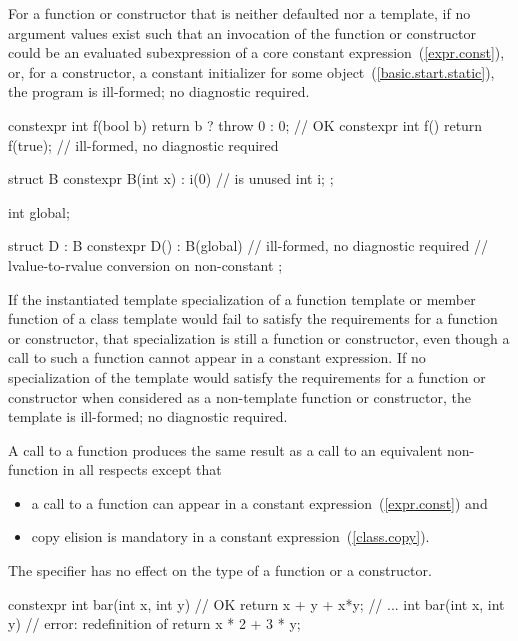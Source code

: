 \pnum
For a  function or  constructor
that is neither defaulted nor a template,
if no argument values exist such that
an invocation of the function or constructor could be an evaluated subexpression of a core
constant expression~(\ref{expr.const}), or,
for a constructor, a constant initializer for some object~(\ref{basic.start.static}),
the program is ill-formed; no diagnostic required.
\begin{example}
\begin{codeblock}
constexpr int f(bool b)
  { return b ? throw 0 : 0; }               // OK
constexpr int f() { return f(true); }       // ill-formed, no diagnostic required

struct B {
  constexpr B(int x) : i(0) { }             //  is unused
  int i;
};

int global;

struct D : B {
  constexpr D() : B(global) { }             // ill-formed, no diagnostic required
                                            // lvalue-to-rvalue conversion on non-constant 
};
\end{codeblock}

\end{example}

\pnum
If the instantiated template specialization of a  function
template
or member function of a class template
would fail to satisfy the requirements for a 
function or  constructor,
that specialization is still a  function or 
constructor, even though a call to such a function cannot appear in a constant
expression. If no specialization of the template would satisfy the
requirements for a  function or  constructor
when considered as a non-template function or constructor, the template is
ill-formed; no diagnostic
required.

\pnum
A call to a  function produces the same result as a call to an equivalent
non- function in all respects except that
\begin{itemize}
\item
a call to a 
function can appear in a constant expression~(\ref{expr.const}) and
\item
copy elision is mandatory in a constant expression~(\ref{class.copy}).
\end{itemize}

\pnum
The  specifier has no
effect on the type of a  function or a  constructor.  \begin{example}
\begin{codeblock}
constexpr int bar(int x, int y) // OK 
    { return x + y + x*y; } 
// ... 
int bar(int x, int y)           // error: redefinition of 
    { return x * 2 + 3 * y; } 
\end{codeblock}
\end{example}

